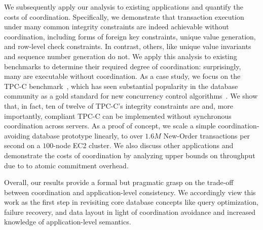 
We subsequently apply our \iconfluence analysis to existing
applications and quantify the costs of coordination. Specifically, we
demonstrate that transaction execution under many common integrity
constraints are indeed achievable without coordination, including
forms of foreign key constraints, unique value generation, and
row-level check constraints. In contrast, others, like unique value
invariants and sequence number generation do not. We apply this
analysis to existing benchmarks to determine their required degree of
coordination: surprisingly, many are executable without
coordination. As a case study, we focus on the TPC-C
benchmark~\cite{tpcc}, which has seen substantial popularity in the
database community as a gold standard for new concurrency control
algorithms~\cite{abadi-vll,jones-dtxn,schism,calvin,hstore,oltpbench}. We
show that, in fact, ten of twelve of TPC-C's integrity constraints are
\iconfluent and, more importantly, compliant TPC-C can be implemented
without synchronous coordination across servers. As a proof of
concept, we scale a simple coordination-avoiding database prototype
linearly, to over $1.6M$ New-Order transactions per second on a
$100$-node EC2 cluster. We also discuss other applications and
demonstrate the costs of coordination by analyzing upper bounds on
throughput due to to atomic commitment overhead.

Overall, our results provide a formal but pragmatic grasp on the
trade-off between coordination and application-level consistency. We
accordingly view this work as the first step in revisiting core
database concepts like query optimization, failure recovery, and data
layout in light of coordination avoidance and increased knowledge of
application-level semantics.


